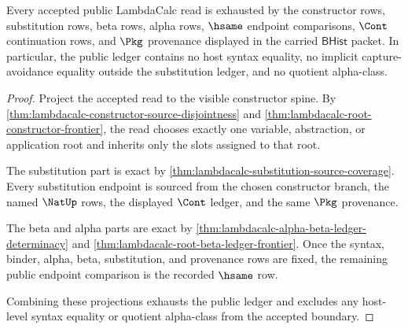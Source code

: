\begin{theorem}
\label{thm:lambdacalc-namecert-ledger-exactness}
Every accepted public LambdaCalc read is exhausted by the constructor rows, substitution rows, beta rows, alpha rows, $\hsame$ endpoint comparisons, $\Cont$ continuation rows, and $\Pkg$ provenance displayed in the carried $\mathsf{BHist}$ packet. In particular, the public ledger contains no host syntax equality, no implicit capture-avoidance equality outside the substitution ledger, and no quotient alpha-class.
\end{theorem}
\begin{proof}
Project the accepted read to the visible constructor spine. By \autoref{thm:lambdacalc-constructor-source-disjointness} and \autoref{thm:lambdacalc-root-constructor-frontier}, the read chooses exactly one variable, abstraction, or application root and inherits only the slots assigned to that root.

The substitution part is exact by \autoref{thm:lambdacalc-substitution-source-coverage}. Every substitution endpoint is sourced from the chosen constructor branch, the named $\NatUp$ rows, the displayed $\Cont$ ledger, and the same $\Pkg$ provenance.

The beta and alpha parts are exact by \autoref{thm:lambdacalc-alpha-beta-ledger-determinacy} and \autoref{thm:lambdacalc-root-beta-ledger-frontier}. Once the syntax, binder, alpha, beta, substitution, and provenance rows are fixed, the remaining public endpoint comparison is the recorded $\hsame$ row.

Combining these projections exhausts the public ledger and excludes any host-level syntax equality or quotient alpha-class from the accepted boundary.
\end{proof}
